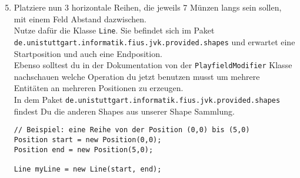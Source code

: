 \begin{enumerate}
	\setcounter{enumi}{4}
    \item Platziere nun 3 horizontale Reihen, die jeweils 7 Münzen langs sein sollen, mit einem Feld Abstand dazwischen.\\
	Nutze dafür die Klasse \lstinline{Line}. Sie befindet sich im Paket\\\texttt{de.unistuttgart.informatik.fius.jvk.provided.shapes} und erwartet eine Startposition und auch eine Endposition.\\
    Ebenso solltest du in der Dokumentation von der \lstinline{PlayfieldModifier} Klasse nachschauen welche Operation du jetzt benutzen musst um mehrere Entitäten an mehreren Positionen zu erzeugen.\\
	\hint In dem Paket \texttt{de.unistuttgart.informatik.fius.jvk.provided.shapes} findest Du die anderen Shapes aus unserer Shape Sammlung.

    \begin{lstlisting}
// Beispiel: eine Reihe von der Position (0,0) bis (5,0)
Position start = new Position(0,0);
Position end = new Position(5,0);

Line myLine = new Line(start, end);
    \end{lstlisting}

\end{enumerate}

